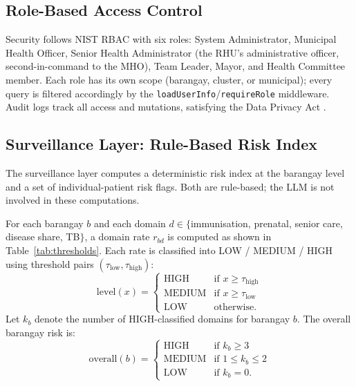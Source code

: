 \documentclass[conference]{IEEEtran}
\begin{document}
\subsection{Role-Based Access Control}
Security follows NIST RBAC \cite{b30} with six roles: System Administrator, Municipal Health Officer, Senior Health Administrator (the RHU's administrative officer, second-in-command to the MHO), Team Leader, Mayor, and Health Committee member. Each role has its own scope (barangay, cluster, or municipal); every query is filtered accordingly by the \texttt{loadUserInfo}/\texttt{requireRole} middleware. Audit logs track all access and mutations, satisfying the Data Privacy Act \cite{b6}.

\subsection{Surveillance Layer: Rule-Based Risk Index}
\label{sec:riskindex}
The surveillance layer computes a deterministic risk index at the barangay level and a set of individual-patient risk flags. Both are rule-based; the LLM is not involved in these computations.

For each barangay $b$ and each domain $d \in \{$immunisation, prenatal, senior care, disease share, TB$\}$, a domain rate $r_{bd}$ is computed as shown in Table~\ref{tab:thresholds}. Each rate is classified into LOW / MEDIUM / HIGH using threshold pairs $(\tau_{\mathrm{low}}, \tau_{\mathrm{high}})$:
\begin{equation}
\mathrm{level}(x)=
\begin{cases}
\mathrm{HIGH} & \text{if } x \geq \tau_{\mathrm{high}}\\
\mathrm{MEDIUM} & \text{if } x \geq \tau_{\mathrm{low}}\\
\mathrm{LOW} & \text{otherwise.}
\end{cases}
\label{eq:level}
\end{equation}
Let $k_b$ denote the number of HIGH-classified domains for barangay $b$. The overall barangay risk is:
\begin{equation}
\mathrm{overall}(b)=
\begin{cases}
\mathrm{HIGH} & \text{if } k_b \geq 3\\
\mathrm{MEDIUM} & \text{if } 1 \leq k_b \leq 2\\
\mathrm{LOW} & \text{if } k_b = 0.
\end{cases}
\label{eq:overall}
\end{equation}
\end{document}
